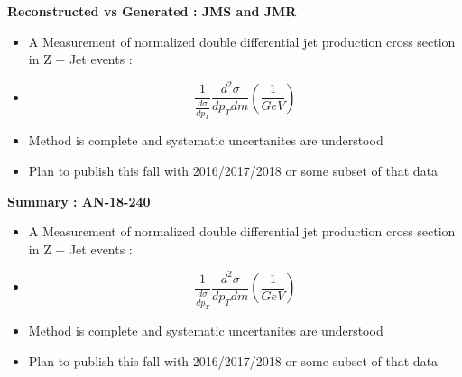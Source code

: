 \documentclass{beamer}
\begin{document}


\begin{frame}{\textbf{Reconstructed vs Generated : JMS and JMR }}
\vspace{3.5mm}
\begin{itemize}
\item A Measurement of normalized double differential jet production cross section in Z + Jet events :
\item[] $$ \frac{1}{ \frac{d\sigma}{dp_{T}} }   \frac{d^2\sigma}{dp_{T} dm}  (\frac{1}{GeV})  $$

\item Method is complete and systematic uncertanites are understood
\item Plan to publish this fall with 2016/2017/2018 or some subset of that data




\end{itemize}
\end{frame}






\begin{frame}{\textbf{Summary : AN-18-240}}
\vspace{3.5mm}
\begin{itemize}
\item A Measurement of normalized double differential jet production cross section in Z + Jet events :
\item[] $$ \frac{1}{ \frac{d\sigma}{dp_{T}} }   \frac{d^2\sigma}{dp_{T} dm}  (\frac{1}{GeV})  $$

\item Method is complete and systematic uncertanites are understood
\item Plan to publish this fall with 2016/2017/2018 or some subset of that data




\end{itemize}
\end{frame}


\end{document}
